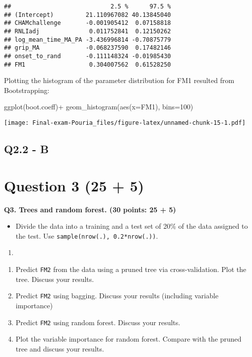 \documentclass[
]{article}
\newenvironment{Shaded}{\begin{snugshade}}{\end{snugshade}}
\newcommand{\AttributeTok}[1]{\textcolor[rgb]{0.77,0.63,0.00}{#1}}
\newcommand{\DecValTok}[1]{\textcolor[rgb]{0.00,0.00,0.81}{#1}}
\newcommand{\FunctionTok}[1]{\textcolor[rgb]{0.00,0.00,0.00}{#1}}
\newcommand{\NormalTok}[1]{#1}
\newcommand{\SpecialCharTok}[1]{\textcolor[rgb]{0.00,0.00,0.00}{#1}}
\providecommand{\tightlist}{%
  \setlength{\itemsep}{0pt}\setlength{\parskip}{0pt}}
\begin{document}
\begin{verbatim}
##                            2.5 %      97.5 %
## (Intercept)         21.110967082 40.13845040
## CHAMchallenge       -0.001905412  0.07158818
## RNLIadj              0.011752841  0.12150262
## log_mean_time_MA_PA -3.436996814 -0.70875779
## grip_MA             -0.068237590  0.17482146
## onset_to_rand       -0.111148324 -0.01985430
## FM1                  0.304007562  0.61528250
\end{verbatim}

Plotting the histogram of the parameter distribution for FM1 resulted
from Bootstrapping:

\begin{Shaded}
\begin{Highlighting}[]
\FunctionTok{ggplot}\NormalTok{(boot.coeff)}\SpecialCharTok{+}
  \FunctionTok{geom\_histogram}\NormalTok{(}\FunctionTok{aes}\NormalTok{(}\AttributeTok{x=}\NormalTok{FM1), }\AttributeTok{bins=}\DecValTok{100}\NormalTok{)}
\end{Highlighting}
\end{Shaded}

\texttt{[image: Final-exam-Pouria\_files/figure-latex/unnamed-chunk-15-1.pdf]}

\hypertarget{q2.2---b}{%
\subsection{Q2.2 - B}\label{q2.2---b}}

\hypertarget{question-3-25-5}{%
\section{Question 3 (25 + 5)}\label{question-3-25-5}}

\textbf{Q3. Trees and random forest. (30 points: 25 + 5)}

\begin{itemize}
\tightlist
\item
  Divide the data into a training and a test set of 20\% of the data
  assigned to the test. Use \texttt{sample(nrow(.),\ 0.2*nrow(.))}.
\end{itemize}

\begin{enumerate}
\def\labelenumi{\arabic{enumi}.}
\tightlist
\item
\end{enumerate}

\begin{enumerate}
\def\labelenumi{\alph{enumi}.}
\tightlist
\item
  Predict \texttt{FM2} from the data using a pruned tree via
  cross-validation. Plot the tree. Discuss your results.
\item
  Predict \texttt{FM2} using bagging. Discuss your results (including
  variable importance)
\item
  Predict \texttt{FM2} using random forest. Discuss your results.
\item
  Plot the variable importance for random forest. Compare with the
  pruned tree and discuss your results.
\end{enumerate}
\end{document}
